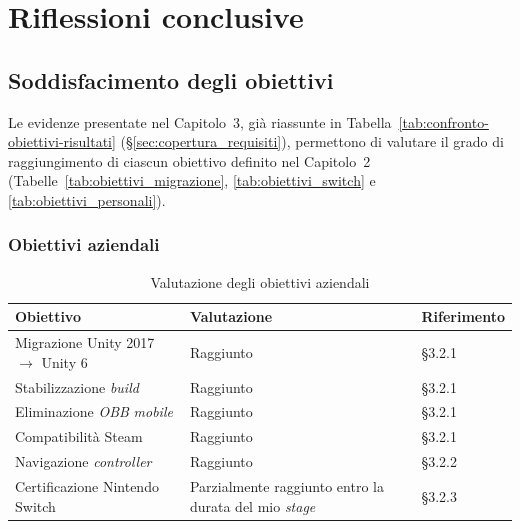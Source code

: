 \chapter{Riflessioni conclusive}

\section{Soddisfacimento degli obiettivi}
\label{sec:soddisfacimento-obiettivi}

 
Le evidenze presentate nel Capitolo~3, già riassunte in Tabella~\ref{tab:confronto-obiettivi-risultati} (\S\ref{sec:copertura_requisiti}), permettono di valutare il grado di raggiungimento di ciascun obiettivo definito nel Capitolo~2 (Tabelle~\ref{tab:obiettivi_migrazione}, \ref{tab:obiettivi_switch} e \ref{tab:obiettivi_personali}).
 
\subsection{Obiettivi aziendali}
 
\begin{table}[h]
\centering
\begin{tabular}{|p{5cm}|p{3cm}|p{4cm}|}
\hline
\textbf{Obiettivo} & \textbf{Valutazione} & \textbf{Riferimento} \\
\hline
Migrazione Unity 2017 $\rightarrow$ Unity 6 & Raggiunto & \S3.2.1 \\
\hline
Stabilizzazione \textit{build} & Raggiunto & \S3.2.1 \\
\hline
Eliminazione \textit{OBB} \textit{mobile} & Raggiunto & \S3.2.1 \\
\hline
Compatibilità Steam & Raggiunto & \S3.2.1 \\
\hline
Navigazione \textit{controller} & Raggiunto & \S3.2.2 \\
\hline
Certificazione Nintendo Switch & Parzialmente raggiunto entro la durata del mio \textit{stage} & \S3.2.3 \\
\hline
\end{tabular}
\caption{Valutazione degli obiettivi aziendali}
\label{tab:valutazione-obiettivi-aziendali}
\end{table}
 
